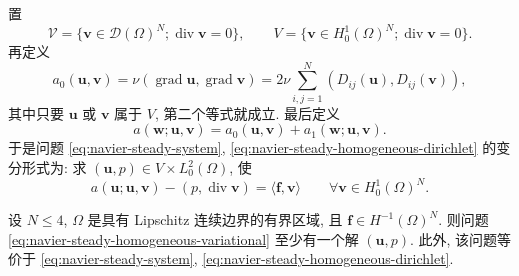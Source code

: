 置
\[
\mathcal V=\{\mathbf v\in\mathcal D(\Omega)^N;
\operatorname{div}\mathbf v=0\},
\qquad
V=\{\mathbf v\in H_0^1(\Omega)^N;
\operatorname{div}\mathbf v=0\}.
\]
再定义
\begin{equation}\label{eq:navier-steady-viscous-form}
a_0(\mathbf u,\mathbf v)
=\nu(\operatorname{grad}\mathbf u,\operatorname{grad}\mathbf v)
=2\nu\sum_{i,j=1}^{N}(D_{ij}(\mathbf u),D_{ij}(\mathbf v)),
\end{equation}
其中只要 $\mathbf u$ 或 $\mathbf v$ 属于 $V$, 第二个等式就成立. 最后定义
\begin{equation}\label{eq:navier-steady-total-form}
a(\mathbf w;\mathbf u,\mathbf v)
=a_0(\mathbf u,\mathbf v)+a_1(\mathbf w;\mathbf u,\mathbf v).
\end{equation}
于是问题 \eqref{eq:navier-steady-system},
\eqref{eq:navier-steady-homogeneous-dirichlet} 的变分形式为: 求
$(\mathbf u,p)\in V\times L_0^2(\Omega)$, 使
\begin{equation}\label{eq:navier-steady-homogeneous-variational}
a(\mathbf u;\mathbf u,\mathbf v)
-(p,\operatorname{div}\mathbf v)
=\langle\mathbf f,\mathbf v\rangle
\qquad\forall\mathbf v\in H_0^1(\Omega)^N.
\end{equation}

\setcounter{statement}{0}
\begin{Theorem}\label{thm:navier-steady-homogeneous-existence}
设 $N\leq4$, $\Omega$ 是具有 Lipschitz 连续边界的有界区域, 且
$\mathbf f\in H^{-1}(\Omega)^N$. 则问题
\eqref{eq:navier-steady-homogeneous-variational} 至少有一个解
$(\mathbf u,p)$. 此外, 该问题等价于
\eqref{eq:navier-steady-system},
\eqref{eq:navier-steady-homogeneous-dirichlet}.
\end{Theorem}

